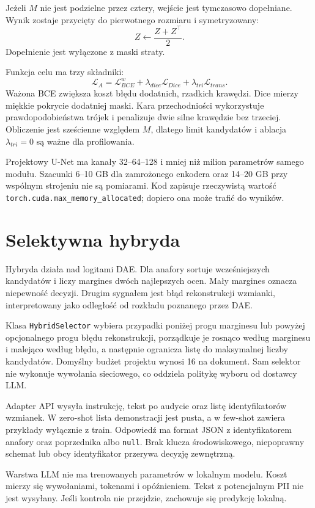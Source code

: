 Jeżeli $M$ nie jest podzielne przez cztery, wejście jest tymczasowo dopełniane. Wynik zostaje przycięty do pierwotnego rozmiaru i symetryzowany:
\[
Z\leftarrow\frac{Z+Z^\top}{2}.
\]
Dopełnienie jest wyłączone z maski straty.

Funkcja celu ma trzy składniki:
\[
\mathcal{L}_{A}
=
\mathcal{L}^{w}_{BCE}
+\lambda_{dice}\mathcal{L}_{Dice}
+\lambda_{tri}\mathcal{L}_{trans}.
\]
Ważona BCE zwiększa koszt błędu dodatnich, rzadkich krawędzi. Dice mierzy miękkie pokrycie dodatniej maski. Kara przechodniości wykorzystuje prawdopodobieństwa trójek i penalizuje dwie silne krawędzie bez trzeciej. Obliczenie jest sześcienne względem $M$, dlatego limit kandydatów i ablacja $\lambda_{tri}=0$ są ważne dla profilowania.

Projektowy U-Net ma kanały 32--64--128 i mniej niż milion parametrów samego modułu. Szacunki 6--10 GB dla zamrożonego enkodera oraz 14--20 GB przy wspólnym strojeniu nie są pomiarami. Kod zapisuje rzeczywistą wartość \texttt{torch.cuda.max\_memory\_allocated}; dopiero ona może trafić do wyników.

\section{Selektywna hybryda}
\label{sec:system-hybryda}

Hybryda działa nad logitami DAE. Dla anafory sortuje wcześniejszych kandydatów i liczy margines dwóch najlepszych ocen. Mały margines oznacza niepewność decyzji. Drugim sygnałem jest błąd rekonstrukcji wzmianki, interpretowany jako odległość od rozkładu poznanego przez DAE.

Klasa \texttt{HybridSelector} wybiera przypadki poniżej progu marginesu lub powyżej opcjonalnego progu błędu rekonstrukcji, porządkuje je rosnąco według marginesu i malejąco według błędu, a następnie ogranicza listę do maksymalnej liczby kandydatów. Domyślny budżet projektu wynosi 16 na dokument. Sam selektor nie wykonuje wywołania sieciowego, co oddziela politykę wyboru od dostawcy LLM.

Adapter API wysyła instrukcję, tekst po audycie oraz listę identyfikatorów wzmianek. W zero-shot lista demonstracji jest pusta, a w few-shot zawiera przykłady wyłącznie z train. Odpowiedź ma format JSON z identyfikatorem anafory oraz poprzednika albo \texttt{null}. Brak klucza środowiskowego, niepoprawny schemat lub obcy identyfikator przerywa decyzję zewnętrzną.

Warstwa LLM nie ma trenowanych parametrów w lokalnym modelu. Koszt mierzy się wywołaniami, tokenami i opóźnieniem. Tekst z potencjalnym PII nie jest wysyłany. Jeśli kontrola nie przejdzie, zachowuje się predykcję lokalną.

